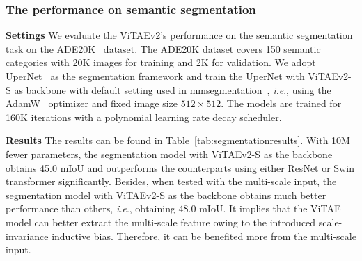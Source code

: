 \documentclass[twocolumn]{svjour3}          \smartqed  \usepackage{natbib}
\newcommand{\ie}{i.e}
\def\onedot{.\xspace}
\def\ie{\emph{i.e}\onedot}
\begin{document}
\begin{table}[htbp]
  \centering
\caption{Semantic segmentation results on the ADE20k~\citep{zhou2017scene} validation set regarding different backbones including ResNet-50~\citep{he2016deep}, Swin-T~\citep{liu2021swin}, DAT-T~\citep{xia2022vision}, and our ViTAEv2-S. MS denotes that multi-scale inputs are used during testing.}
    \label{tab:segmentationresults}\end{table}


\subsubsection{The performance on semantic segmentation}

\textbf{Settings} We evaluate the ViTAEv2's performance on the semantic segmentation task on the ADE20K~\citep{zhou2017scene,zhou2019semantic} dataset. The ADE20K dataset covers 150 semantic categories with 20K images for training and 2K for validation. We adopt UperNet~\citep{xiao2018unified} as the segmentation framework and train the UperNet with ViTAEv2-S as backbone with default setting used in mmsegmentation~\citep{mmseg2020}, \ie, using the AdamW~\citep{loshchilov2017decoupled} optimizer and fixed image size $512 \times 512$. The models are trained for 160K iterations with a polynomial learning rate decay scheduler. 

\noindent \textbf{Results} The results can be found in Table~\ref{tab:segmentationresults}. With 10M fewer parameters, the segmentation model with ViTAEv2-S as the backbone obtains 45.0 mIoU and outperforms the counterparts using either ResNet or Swin transformer significantly. Besides, when tested with the multi-scale input, the segmentation model with ViTAEv2-S as the backbone obtains much better performance than others, \ie, obtaining 48.0 mIoU. It implies that the ViTAE model can better extract the multi-scale feature owing to the introduced scale-invariance inductive bias. Therefore, it can be benefited more from the multi-scale input.
\end{document}
